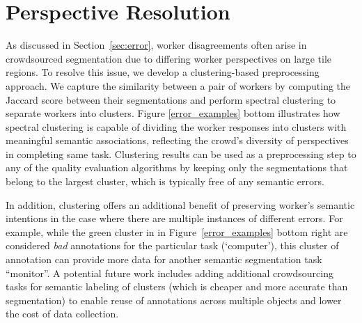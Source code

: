 \section{Perspective Resolution\label{perspective}}
As discussed in Section~\ref{sec:error}, worker disagreements often arise in crowdsourced segmentation due to differing worker perspectives on large tile regions. To resolve this issue, we develop a clustering-based preprocessing approach.
We capture the similarity between a pair of workers by computing the Jaccard score between their segmentations and perform spectral clustering to separate workers into clusters. Figure \ref{error_examples} bottom illustrates how spectral clustering is capable of dividing the worker responses into clusters with meaningful semantic associations, reflecting the crowd's diversity of perspectives in completing same task. Clustering results can be used as a preprocessing step to any of the quality evaluation algorithms by keeping only the segmentations that belong to the largest cluster, which is typically free of any semantic errors.
\par In addition, clustering offers an additional benefit of preserving worker's semantic intentions in the case where there are multiple instances of different errors. For example, while the green cluster in in Figure~\ref{error_examples} bottom right are considered \textit{bad} annotations for the particular task (`computer'), this cluster of annotation can provide more data for another semantic segmentation task ``monitor''. A potential future work includes adding additional crowdsourcing tasks for semantic labeling of clusters (which is cheaper and more accurate than segmentation) to enable reuse of annotations across multiple objects and lower the cost of data collection. 